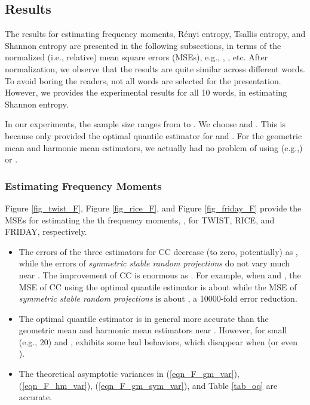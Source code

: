 \documentclass{sig-alternate}
\begin{document}
\subsection{Results}

The results for estimating frequency moments, R\'enyi entropy, Tsallis entropy, and Shannon entropy are presented in the following subsections, in terms of the normalized (i.e., relative) mean square errors (MSEs), e.g., , , etc. After normalization, we observe that the results are quite similar across different words. To avoid boring the readers, not all words are selected for the presentation. However, we provides the experimental results for all 10 words, in estimating Shannon entropy.

In our experiments, the sample size  ranges from  to . We choose  and . This is because \cite{Report:Li_CC_oq} only provided the optimal quantile estimator for  and . For the geometric mean and harmonic mean estimators, we actually had no problem of using (e.g.,)  or .

\subsubsection{Estimating Frequency Moments}




Figure \ref{fig_twist_F}, Figure \ref{fig_rice_F}, and Figure \ref{fig_friday_F} provide the MSEs for estimating the th  frequency moments, , for TWIST, RICE, and FRIDAY, respectively.
\begin{itemize}
\item The errors of the three estimators for CC decrease (to zero, potentially) as , while the errors of {\em symmetric stable random projections} do not vary much near . The improvement of CC is enormous as . For example, when  and , the MSE of CC using the optimal quantile estimator is about  while the MSE of {\em symmetric stable random projections} is about , a 10000-fold error reduction.
\item The optimal quantile estimator  is in general more accurate than the geometric mean and harmonic mean estimators near . However, for small  (e.g., 20) and ,  exhibits some bad behaviors, which disappear when  (or even ).
\item The theoretical asymptotic variances in (\ref{eqn_F_gm_var}), (\ref{eqn_F_hm_var}), (\ref{eqn_F_gm_sym_var}), and Table \ref{tab_oq} are accurate.
\end{itemize}

\newpage
\end{document}
